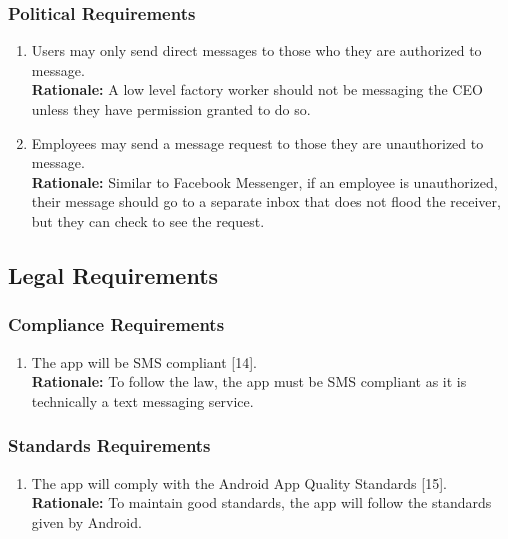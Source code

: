 \documentclass[]{article}
\begin{document}
\subsubsection{Political Requirements}
\label{ssub:political_requirements}
\begin{enumerate}[{CP-P}1. ]
	\item Users may only send direct messages to those who they are authorized to message.
	      \\\textbf{Rationale:} A low level factory worker should not be messaging the CEO unless they have permission granted to do so.
	\item Employees may send a message request to those they are unauthorized to message.
	      \\\textbf{Rationale:} Similar to Facebook Messenger, if an employee is unauthorized, their message should go to a separate inbox that does not flood the receiver, but they can check to see the request.
\end{enumerate}


\subsection{Legal Requirements}
\label{sub:legal_requirements}

\subsubsection{Compliance Requirements}
\label{ssub:compliance_requirements}
\begin{enumerate}[{LR-COMP}1. ]
	\item The app will be SMS compliant [14].
	      \\\textbf{Rationale:} To follow the law, the app must be SMS compliant as it is technically a text messaging service.
\end{enumerate}

\subsubsection{Standards Requirements}
\label{ssub:standards_requirements}
\begin{enumerate}[{LR-STD}1. ]
	\item The app will comply with the Android App Quality Standards [15].
	      \\\textbf{Rationale:} To maintain good standards, the app will follow the standards given by Android.
\end{enumerate}
\end{document}
